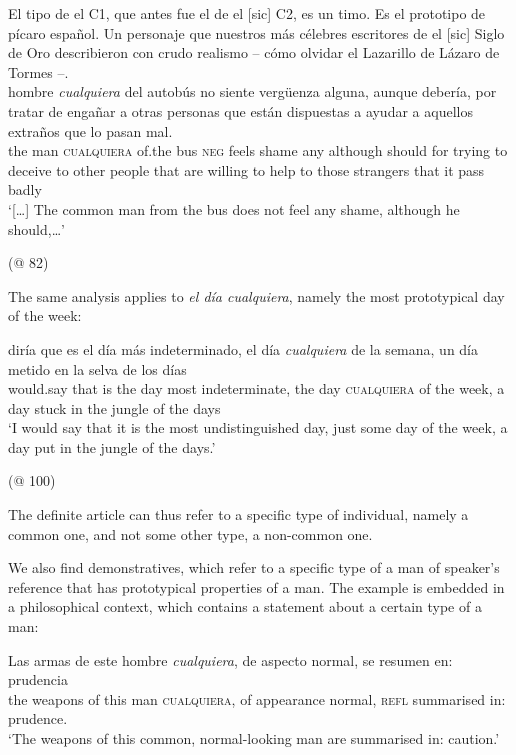 {\ea \label{bkm:Ref63545986} %
El tipo de el C1, que antes fue el de el [sic] C2, es un timo. Es el prototipo de pícaro español. Un personaje que nuestros más célebres escritores de el [sic] Siglo de Oro describieron con crudo realismo – cómo olvidar el Lazarillo de Lázaro de Tormes –.\\ 

 {hombre} \textit{cualquiera} {del} {autobús} {no} {siente} {vergüenza} {alguna,} {aunque} {debería,} {por} {tratar} {de} {engañar} {a} {otras} {personas} {que} {están} {dispuestas} {a} {ayudar} {a} {aquellos} {extraños} {que} {lo} {pasan} {mal}.\\
the man \textsc{cualquiera} of.the bus \textsc{neg} feels shame any although should for trying to deceive to other people that are willing to help to those strangers that it pass badly\\
\glt ‘[…] The common man from the bus does not feel any shame, although he should,…’

  (@ 82)
\z

The same analysis applies to \textit{el día cualquiera}, namely the most prototypical day of the week:

\ea \label{ex:key:164} %
\gll diría que es el día más indeterminado, el día \textit{cualquiera} de la semana, un día metido en la selva de los días\\
would.say that is the day most indeterminate, the day \textsc{cualquiera} of the week, a day stuck in the jungle of the days\\
\glt ‘I would say that it is the most undistinguished day, just some day of the week, a day put in the jungle of the days.’

  (@ 100)
\z

The definite article can thus refer to a specific type of individual, namely a common one, and not some other type, a non-common one.

We also find demonstratives, which refer to a specific type of a man of speaker’s reference that has prototypical properties of a man. The example is embedded in a philosophical context, which contains a statement about a certain type of a man:

\ea \label{bkm:Ref63545989} %
\gll Las armas de este hombre \textit{cualquiera}, de aspecto normal, se resumen en: prudencia\\
the weapons of this man \textsc{cualquiera}, of appearance normal, \textsc{refl} summarised in: prudence.\\
\glt ‘The weapons of this common, normal-looking man are summarised in: caution.’

}

